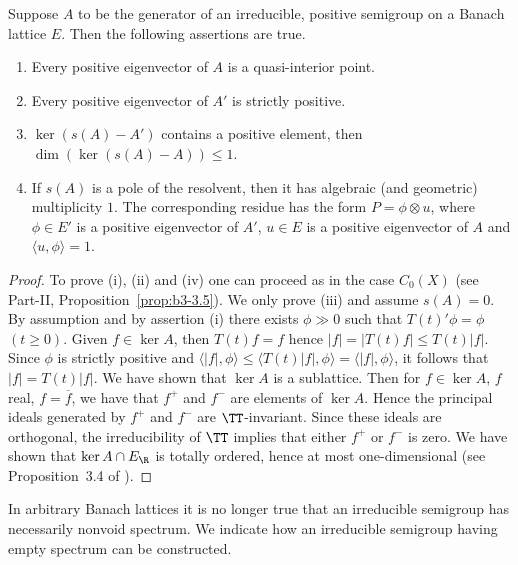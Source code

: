 \begin{proposition}\label{prop:c3-3.5}
	
	Suppose $A$ to be the generator of an irreducible, positive semigroup on a Banach lattice $E$.
	Then the following assertions are true.
	\begin{enumerate}[\upshape (i)]
	\item 
	Every positive eigenvector of\/ $A$ is a quasi-interior point.
	
	\item 
	Every positive eigenvector of\/ $A'$ is strictly positive.
	
	\item 
	$\ker(s(A) - A')$ contains a positive element, then $\dim(\ker(s(A) - A)) \leq 1$.
	
	\item If\/ $s(A)$ is a pole of the resolvent, then it has algebraic (and geometric) multiplicity $1$.
	The corresponding residue has the form $P = \phi\otimes u$, where $\phi \in E'$ is a positive eigenvector of\/ $A'$, $u \in E$ is a positive eigenvector of\/ $A$ and $\langle u,\phi \rangle = 1$.
	\end{enumerate}
\end{proposition}
\begin{proof}
    To prove (i), (ii) and (iv) one can proceed as in the case $C_{0}(X)$ (see Part-II, Proposition~\ref{prop:b3-3.5}).
    We only prove (iii) and assume $s(A) = 0$.
    By assumption and by assertion (i) there exists $\phi \gg 0$ such that $T(t)'\phi = \phi$ $(t\geq0)$.
    Given $f \in \ker A$, then $T(t)f = f$ hence $|f| = |T(t)f| \leq T(t)|f|$.
    Since $\phi$ is strictly positive and $\langle|f|,\phi\rangle \leq \langle T(t)|f|,\phi\rangle = \langle|f|,\phi\rangle$, it follows that $|f| = T(t)|f|$.
    We have shown that $\ker A$ is a sublattice.
    Then for $f \in \ker A$, $f$ real, \ie  $f = \overline{f}$, we have that $f^{+}$ and $f^{-}$ are elements of\/ $\ker A$.
    Hence the principal ideals generated by $f^{+}$ and $f^{-}$ are $\TT$-invariant.
    Since these ideals are orthogonal, the irreducibility of\/ $\TT$ implies that either $f^{+}$ or $f^{-}$ is zero.
    We have shown that $\ker A \cap E_{\R }$ is totally ordered, hence at most one-dimensional (see Proposition~3.4 of \textcite{schaefer:1974}).
\end{proof}
In arbitrary Banach lattices it is no longer true that an irreducible semigroup has necessarily nonvoid spectrum.
We indicate how an irreducible semigroup having empty spectrum can be constructed.

